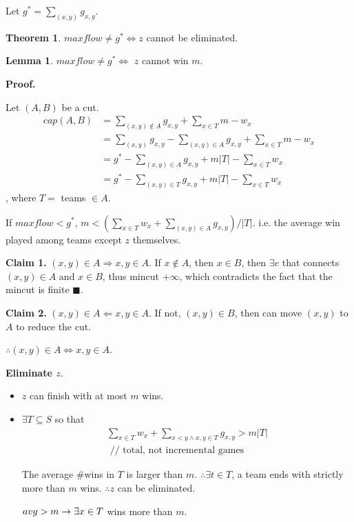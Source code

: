 \documentclass[a4paper]{report}
\theoremstyle{definition}
\newtheorem{thm}{Theorem}[section]
\newtheorem{lem}{Lemma}[section]
\begin{document}
Let $g^*=\sum_{(x,y)} g_{x, y}$.

\begin{thm}
$maxflow \neq g^* \Leftrightarrow z$ cannot be eliminated. 
\end{thm}
\begin{lem}
$maxflow \neq g^* \Leftrightarrow$ $z$ cannot win $m$.
\end{lem}

\textbf{Proof.}

Let $(A, B)$ be a cut.
\begin{align*}
cap(A, B) &= \sum_{(x,y)\notin A} g_{x,y}+\sum_{x\in T} m-w_x\\
&= \sum_{(x,y)}g_{x, y}-\sum_{(x, y)\in A} g_{x, y}+\sum_{x\in T}m-w_x\\
&= g^*-\sum_{(x, y)\in A} g_{x, y}+m|T|-\sum_{x\in T}w_x\\
&= g^*-\sum_{(x, y)\in T} g_{x, y}+m|T|-\sum_{x\in T}w_x
\end{align*}
, where $T=$ teams $\in A$.

If $maxflow <g^*$, $m<(\sum_{x\in T} w_x+\sum_{(x,y)\in A} g_{x,y})/|T|$. i.e. the average win played among teams except $z$ themselves.

\textbf{Claim 1.} $(x,y)\in A \Rightarrow x,y \in A$. If $x \notin A$, then $x \in B$, then $\exists e$ that connects $(x,y)\in A$ and $x\in B$, thus mincut $+\infty$, which contradicts the fact that the mincut is finite $\blacksquare$.

\textbf{Claim 2.} $(x,y)\in A \Leftarrow x,y \in A$. If not, $(x,y)\in B$, then can move $(x, y)$ to $A$ to reduce the cut. 

$\therefore (x,y)\in A \Leftrightarrow x,y \in A$. 

\textbf{Eliminate $z$}.
\begin{itemize}
\item $z$ can finish with at most $m$ wins.
\item $\exists T\subseteq S$ so that
\begin{align*}
\sum_{x\in T} w_x + \sum_{x<y \wedge x, y \in T} g_{x, y} > m|T|  \\
\text{ // total, not incremental games}
\end{align*}


The average \#wins in $T$ is larger than $m$. $\therefore \exists t \in T$, a team ends with strictly more than $m$ wins. $\therefore z$  can be eliminated.

$avg > m \rightarrow \exists x\in T$ wins more than $m$. 
\end{itemize}
\end{document}
